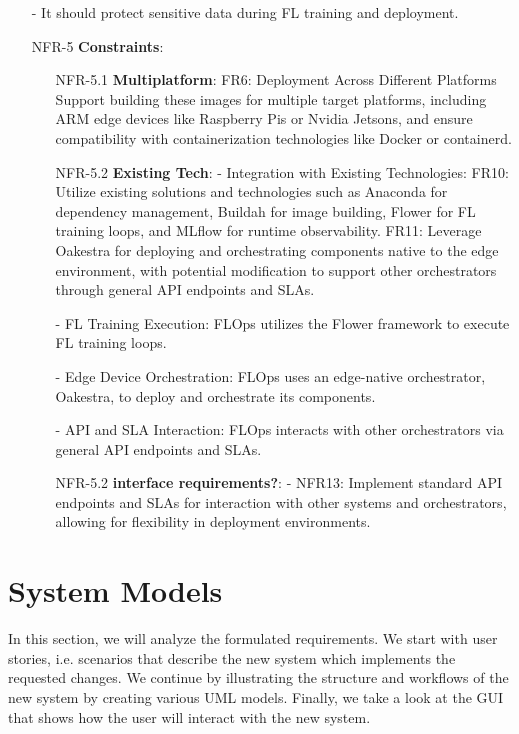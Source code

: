 \begin{itemize}
        - It should protect sensitive data during FL training and deployment.
    \item [NFR-5] {\textbf{Constraints}}: %
        \begin{itemize}
            \item [NFR-5.1] {\textbf{Multiplatform}}:
                FR6: Deployment Across Different Platforms
                Support building these images for multiple target platforms, including ARM edge devices like Raspberry Pis or Nvidia Jetsons,
                and ensure compatibility with containerization technologies like Docker or containerd.
            \item [NFR-5.2] {\textbf{Existing Tech}}: %
                - Integration with Existing Technologies:
                    FR10: Utilize existing solutions and technologies such as Anaconda for dependency management, Buildah for image building, Flower for FL training loops, and MLflow for runtime observability.
                    FR11: Leverage Oakestra for deploying and orchestrating components native to the edge environment, with potential modification to support other orchestrators through general API endpoints and SLAs.

                - FL Training Execution:
                    FLOps utilizes the Flower framework to execute FL training loops.

                - Edge Device Orchestration:
                    FLOps uses an edge-native orchestrator, Oakestra, to deploy and orchestrate its components.

                - API and SLA Interaction:
                    FLOps interacts with other orchestrators via general API endpoints and SLAs.
            \item [NFR-5.2] {\textbf{interface requirements?}}:
                - NFR13: Implement standard API endpoints and SLAs for interaction with other systems and orchestrators, allowing for flexibility in deployment environments.
        \end{itemize}
\end{itemize}




\section{System Models}

In this section, we will analyze the formulated requirements. We start with user stories, i.e. scenarios that describe the new system which implements the requested changes.
We continue by illustrating the structure and workflows of the new system by creating various UML models.
Finally, we take a look at the GUI that shows how the user will interact with the new system.

